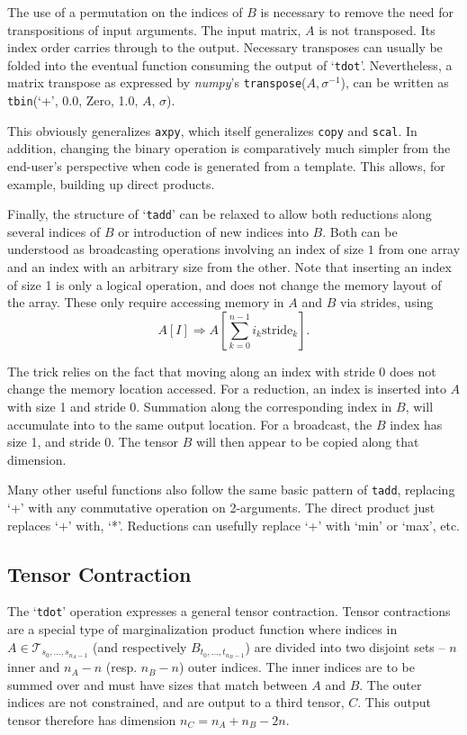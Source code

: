 \documentclass[preprint]{sigplanconf}
\begin{document}
  The use of a permutation on the indices of $B$ is necessary to remove the need
for transpositions of input arguments.  The input matrix, $A$ is not transposed.
Its index order carries through to the output.  Necessary transposes can usually
be folded into the eventual function consuming the output of `{\tt tdot}'.  Nevertheless,
a matrix transpose as expressed by {\em numpy}'s {\tt transpose}($A, \sigma^{-1}$),
can be written as {\tt tbin}(`+', 0.0, Zero, 1.0, $A$, $\sigma$).  

  This obviously generalizes {\tt axpy}, which itself generalizes {\tt copy} and {\tt scal}.
In addition, changing the binary operation is comparatively much simpler from the end-user's
perspective when code is generated from a template.  This allows, for example,
building up direct products.

  Finally, the structure of `{\tt tadd}' can be relaxed to allow both reductions along
several indices of $B$ or introduction of new indices into $B$.  Both can be understood
as broadcasting operations\cite{numpy} involving an index of size $1$ from one
array and an index with an arbitrary size from the other.  Note that inserting an index of size 1
is only a logical operation, and does not change the memory layout of the array.
These only require accessing memory in $A$ and $B$ via strides, using
\begin{equation}
A[I] \Rightarrow A\left[\sum_{k=0}^{n-1} i_k \text{stride}_k\right].
\end{equation}

  The trick relies on the fact that moving along an index with stride 0
does not change the memory location accessed.
For a reduction, an index is inserted into $A$ with size 1 and stride 0.
Summation along the corresponding index in $B$, will accumulate into
to the same output location.
For a broadcast, the $B$ index has size 1, and stride 0.
The tensor $B$ will then appear to be copied along that dimension.

  Many other useful functions also follow the same basic pattern of {\tt tadd},
replacing `+' with any commutative operation on 2-arguments.
The direct product just replaces `+' with, `*'.  Reductions can usefully replace
`+' with `min' or `max', etc.

\subsection{ Tensor Contraction}

  The `{\tt tdot}' operation expresses a general tensor contraction.  Tensor
contractions are a special type of marginalization product function\cite{mpf} where
indices in $A \in \mathcal T_{s_0,\ldots,s_{n_A-1}}$ (and respectively $B_{t_0,\ldots,t_{n_B-1}}$)
are divided into two disjoint sets -- $n$ inner and $n_A - n$ (resp. $n_B-n$) outer indices.
The inner indices are to be summed over and must have sizes that
match between $A$ and $B$.  The outer indices are not constrained,
and are output to a third tensor, $C$.  This output tensor therefore has dimension
$n_C = n_A + n_B - 2 n$.
\end{document}
